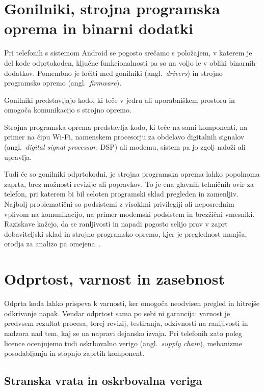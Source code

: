 \documentclass[a4paper,12pt,openright]{book}
\begin{document}
\section{Gonilniki, strojna programska oprema in binarni dodatki}
\label{sec:teorija_firmware}

Pri telefonih s sistemom Android se pogosto srečamo s položajem, v katerem je del kode odprtokoden, ključne funkcionalnosti pa so na voljo le v obliki binarnih dodatkov.
Pomembno je ločiti med gonilniki (angl.~\textit{drivers}) in strojno programsko opremo (angl.~\textit{firmware}).

Gonilniki predstavljajo kodo, ki teče v jedru ali uporabniškem prostoru in omogoča komunikacijo s strojno opremo.

Strojna programska oprema predstavlja kodo, ki teče na sami komponenti, na primer na čipu Wi-Fi, namenskem procesorju za obdelavo digitalnih signalov (angl.~\textit{digital signal processor}, DSP) ali modemu, sistem pa jo zgolj naloži ali upravlja.

Tudi če so gonilniki odprtokodni, je strojna programska oprema lahko popolnoma zaprta, brez možnosti revizije ali popravkov.
To je ena glavnih tehničnih ovir za telefon, pri katerem bi bil celoten programski sklad pregleden in zamenljiv.
Najbolj problematični so podsistemi z visokimi privilegiji ali neposrednim vplivom na komunikacijo, na primer modemski podsistem in brezžični vmesniki.
Raziskave kažejo, da se ranljivosti in napadi pogosto selijo prav v zaprt dobaviteljski sklad in strojno programsko opremo, kjer je preglednost manjša, orodja za analizo pa omejena~\cite{hernandez_firmwire_ndss2022,davis_cellular_baseband_security_2012}.

\section{Odprtost, varnost in zasebnost}
\label{sec:teorija_varnost}

Odprta koda lahko prispeva k varnosti, ker omogoča neodvisen pregled in hitrejše odkrivanje napak.
Vendar odprtost sama po sebi ni garancija; varnost je predvsem rezultat procesa, torej revizij, testiranja, odzivnosti na ranljivosti in nadzora nad tem, kaj se na napravi dejansko izvaja.
Pri telefonih zato poleg licence ocenjujemo tudi oskrbovalno verigo (angl.~\textit{supply chain}), mehanizme posodabljanja in stopnjo zaprtih komponent.

\subsection{Stranska vrata in oskrbovalna veriga}
\label{subsec:teorija_backdoor}
\end{document}
